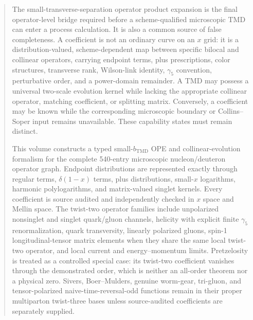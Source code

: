 \documentclass[11pt]{article}
\begin{document}
\begin{abstract}
The small-transverse-separation operator product expansion is the final operator-level bridge required before a scheme-qualified microscopic TMD can enter a process calculation.  It is also a common source of false completeness.  A coefficient is not an ordinary curve on an \(x\) grid: it is a distribution-valued, scheme-dependent map between specific bilocal and collinear operators, carrying endpoint terms, plus prescriptions, color structures, transverse rank, Wilson-link identity, \(\gamma_5\) convention, perturbative order, and a power-domain remainder.  A TMD may possess a universal two-scale evolution kernel while lacking the appropriate collinear operator, matching coefficient, or splitting matrix.  Conversely, a coefficient may be known while the corresponding microscopic boundary or Collins--Soper input remains unavailable.  These capability states must remain distinct.

This volume constructs a typed small-\(b_{\mathrm{TMD}}\) OPE and collinear-evolution formalism for the complete 540-entry microscopic nucleon/deuteron operator graph.  Endpoint distributions are represented exactly through regular terms, \(\delta(1-x)\) terms, plus distributions, small-\(x\) logarithms, harmonic polylogarithms, and matrix-valued singlet kernels.  Every coefficient is source audited and independently checked in \(x\) space and Mellin space.  The twist-two operator families include unpolarized nonsinglet and singlet quark/gluon channels, helicity with explicit finite \(\gamma_5\) renormalization, quark transversity, linearly polarized gluons, spin-1 longitudinal-tensor matrix elements when they share the same local twist-two operator, and local current and energy--momentum limits.  Pretzelosity is treated as a controlled special case: its twist-two coefficient vanishes through the demonstrated order, which is neither an all-order theorem nor a physical zero.  Sivers, Boer--Mulders, genuine worm-gear, tri-gluon, and tensor-polarized naive-time-reversal-odd functions remain in their proper multiparton twist-three bases unless source-audited coefficients are separately supplied.


\end{abstract}
\end{document}
